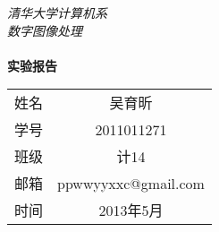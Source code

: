 
\newcommand{\HUGE}{\fontsize{29pt}{29pt}\selectfont}
\renewcommand{\today}{\number\year 年 \number\month 月 \number\day 日}
\begin{titlepage}


\phantom{Start!}

\vspace{-1.7cm}

\begin{flushleft}

\emph{\Large 清华大学计算机系}\\[0.2cm]

\emph{\Large 数字图像处理}\\[5.2cm]


\hspace{3cm}{ \HUGE \bfseries 图像拼接}\\[0.4cm]


\hspace{3cm} {\huge \bfseries 实验报告}

\end{flushleft}





\vfill



\begin{flushright}

{



\newcommand{\pillar}{ {\Huge \phantom{A}} }

\large

\begin{tabular}{lc}

\pillar 姓名 & 吴育昕\\\cline{2-2}

\pillar 学号 & 2011011271 \\\cline{2-2}

\pillar 班级 & 计14 \\\cline{2-2}

\pillar 邮箱 &ppwwyyxxc@gmail.com \\\cline{2-2}

\pillar 时间 &2013年5月 \\\cline{2-2}

\end{tabular}

}

\end{flushright}

\end{titlepage}
